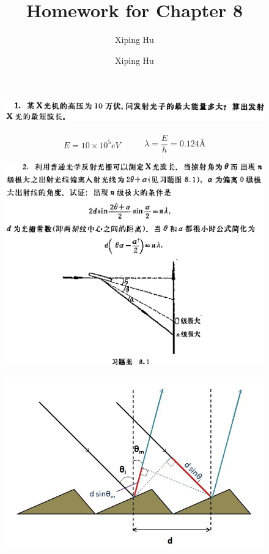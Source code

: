 \documentclass{article}
\author{Xiping Hu}
\author{Xiping Hu}
\affil{https://hxp.plus/}
\title{Homework for Chapter 8}
\begin{document}
\maketitle

\begin{figure}[H]
  \centering
  \includegraphics[width=\linewidth]{figures/Problem1}
  \label{fig:}
\end{figure}

\begin{equation*}
  \begin{aligned}
    E = 10 \times 10^5 \si{eV}
  \end{aligned}
  \quad\quad 
  \begin{aligned}
    \lambda = \dfrac{E}{h} = 0.124 \si{\angstrom}
  \end{aligned}
\end{equation*}

\begin{figure}[H]
  \centering
  \includegraphics[width=\linewidth]{figures/Problem2}
  \label{fig:}
\end{figure}

\begin{figure}[H]
  \centering
  \includegraphics[width=0.7\linewidth]{figures/Problem22}
  \label{fig:}
\end{figure}
\end{document}
